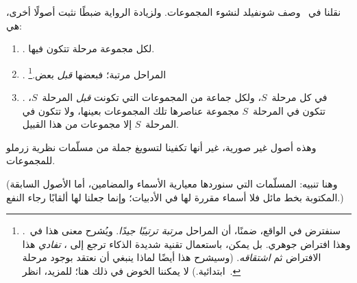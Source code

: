 \documentclass[../../../include/open-logic-section]{subfiles}
\begin{document}
	
نقلنا في~ وصف شونفيلد لنشوء المجموعات.
ولزيادة الرواية ضبطًا نثبت أصولًا أخرى، هي:
\begin{enumerate}
\item[] \stageshier. لكل مجموعة مرحلة تتكون فيها.
\item[] \stagesord. المراحل مرتبة؛ فبعضها \emph{قبل}
بعض.\footnote{سنفترض في الواقع، ضمنًا، أن المراحل \emph{مرتبة
  ترتيبًا جيدًا}. ويُشرح معنى هذا في~.
  وهذا افتراض جوهري. بل يمكن، باستعمال تقنية شديدة الذكاء ترجع إلى
  \citet{Scott1974}، \emph{تفادي} هذا الافتراض ثم \emph{اشتقاقه}.
  (وسيشرح هذا أيضًا لماذا ينبغي أن نعتقد بوجود مرحلة ابتدائية.) لا
  يمكننا الخوض في ذلك هنا؛ للمزيد، انظر~\citet{ButtonLT1}.}
\item[] \stagesacc. في كل مرحلة~$S$، ولكل جماعة من المجموعات التي تكونت
  \emph{قبل} المرحلة~$S$، تتكون في المرحلة~$S$ مجموعة عناصرها تلك
  المجموعات بعينها، ولا تتكون في المرحلة~$S$ إلا مجموعات من هذا القبيل.
\end{enumerate}
وهذه أصول غير صورية، غير أنها تكفينا لتسويغ جملة من مسلّمات نظرية
زرملو للمجموعات.

(وهنا تنبيه: المسلّمات التي سنوردها معيارية الأسماء والمضامين، أما
الأصول السابقة المكتوبة بخط مائل فلا أسماء مقررة لها في الأدبيات؛
وإنما جعلنا لها ألقابًا رجاء النفع.)
\end{document}
